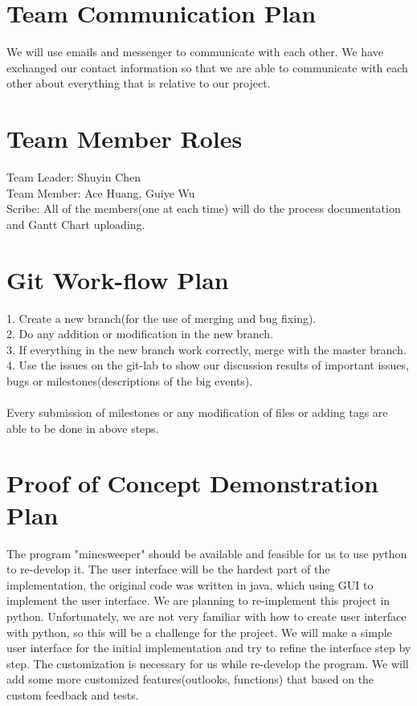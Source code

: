 \documentclass[10pt]{article}
\begin{document}
\section{Team Communication Plan}
    We will use emails and messenger to communicate with each other. We have exchanged our contact information so that we are able to communicate with each other about everything that is relative to our project.

\newpage

\section{Team Member Roles}
    Team Leader: Shuyin Chen\\
	Team Member: Ace Huang, Guiye Wu \\
	Scribe: All of the members(one at each time)
	will do the process documentation and Gantt Chart uploading.

\newpage

\section{Git Work-flow Plan}
1. Create a new branch(for the use of merging and bug fixing).\\
2. Do any addition or modification in the new branch.\\
3. If everything in the new branch work correctly, merge with the master branch.\\
4. Use the issues on the git-lab to show our discussion results of important issues, bugs or milestones(descriptions of the big events).\\
\\
Every submission of milestones or any modification of files or adding tags are able to be done in above steps.
\newpage
\section{Proof of Concept Demonstration Plan}

    The program "minesweeper" should be available and feasible for us to use python to re-develop it. The user interface will be the hardest part of the implementation, the original code was written in java, which using GUI to implement the user interface. We are planning to re-implement this project in python. Unfortunately, we are not very familiar with how to create user interface with python, so this will be a challenge for the project. 
    We will make a simple user interface for the initial implementation and try to refine the interface step by step. The customization is necessary for us while re-develop the program. We will add some more customized features(outlooks, functions) that based on the custom feedback and tests.
      
\end{document}
